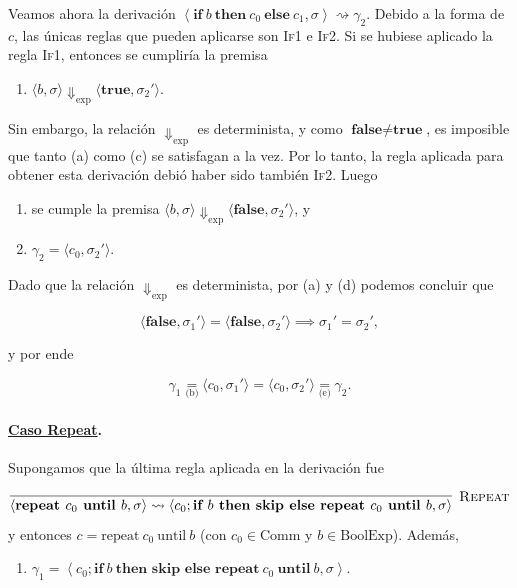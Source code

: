\documentclass[12pt, a4paper]{article}
\begin{document}
Veamos ahora la derivación
$
\left\langle
\textbf{if}\ b\ \textbf{then}\ c_0\ \textbf{else}\ c_1,\sigma
\right\rangle
\rightsquigarrow
\gamma_2
$.
Debido a la forma de $c$, las únicas reglas que pueden aplicarse son
\textsc{If1} e \textsc{If2}. Si se hubiese aplicado la regla \textsc{If1}, entonces se cumpliría la premisa

\begin{enumerate}
    \item[c.] $\langle b,\sigma\rangle
    \Downarrow_{\mathrm{exp}}
    \langle \textbf{true},\sigma_2'\rangle$.
\end{enumerate}
Sin embargo, la relación $\Downarrow_{\mathrm{exp}}$ es determinista, y como $\textbf{false} \neq \textbf{true}$, es imposible que tanto (a) como (c) se satisfagan a la vez. Por lo tanto, la regla aplicada para obtener esta derivación debió haber sido también \textsc{If2}. Luego

\begin{enumerate}
    \item[d.] se cumple la premisa $\langle b,\sigma\rangle
    \Downarrow_{\mathrm{exp}}
    \langle \textbf{false},\sigma_2'\rangle$, y

    \item[e.] $\gamma_2
    =
    \langle c_0,\sigma_2'\rangle$.
\end{enumerate}

Dado que la relación $\Downarrow_{\mathrm{exp}}$ es determinista, por (a) y (d) podemos concluir que

\[
\langle \textbf{false},\sigma_1'\rangle
=
\langle \textbf{false},\sigma_2'\rangle
\implies
\sigma_1'=\sigma_2',
\]

y por ende

\[
\gamma_1
\underset{\text{(b)}}{=}
\langle c_0,\sigma_1'\rangle
=
\langle c_0,\sigma_2'\rangle
\underset{\text{(e)}}{=}
\gamma_2.
\]


\paragraph{\underline{Caso Repeat}.}
Supongamos que la última regla aplicada en la derivación fue 

\[
  \infer[\textsc{Repeat}]{\langle \textbf{repeat } c_0 \textbf{ until } b, \sigma \rangle \rightsquigarrow \langle c_0; \textbf{if } b \textbf{ then skip else repeat } c_0 \textbf{ until } b, \sigma \rangle}{}
\]
y entonces $c = \mathrm{repeat}\ c_0\ \mathrm{until}\ b$
(con $c_0\in\mathrm{Comm}$ y $b\in\mathrm{BoolExp}$). Además,
\begin{enumerate}
    \item[a.] $\gamma_1
    =
    \left\langle
    c_0;\textbf{if}\ b\ \textbf{then skip else repeat}\ c_0\ \textbf{until}\ b,
    \sigma
    \right\rangle$.
\end{enumerate}
\end{document}
